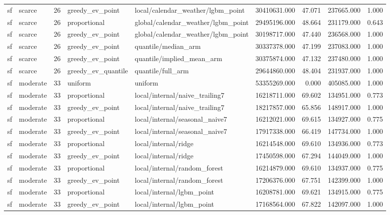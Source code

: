 \begin{tabular}{llrllrrrr}
sf & scarce & 26 & greedy\_ev\_point & local/calendar\_weather/lgbm\_point & 30410631.000 & 47.071 & 237665.000 & 1.000 \\
sf & scarce & 26 & proportional & global/calendar\_weather/lgbm\_point & 29495196.000 & 48.664 & 231179.000 & 0.643 \\
sf & scarce & 26 & greedy\_ev\_point & global/calendar\_weather/lgbm\_point & 30198717.000 & 47.440 & 236568.000 & 1.000 \\
sf & scarce & 26 & greedy\_ev\_point & quantile/median\_arm & 30337378.000 & 47.199 & 237083.000 & 1.000 \\
sf & scarce & 26 & greedy\_ev\_point & quantile/implied\_mean\_arm & 30375874.000 & 47.132 & 237480.000 & 1.000 \\
sf & scarce & 26 & greedy\_ev\_quantile & quantile/full\_arm & 29644860.000 & 48.404 & 231937.000 & 1.000 \\
sf & moderate & 33 & uniform & uniform & 53355269.000 & 0.000 & 405085.000 & 1.000 \\
sf & moderate & 33 & proportional & local/internal/naive\_trailing7 & 16218711.000 & 69.602 & 134951.000 & 0.773 \\
sf & moderate & 33 & greedy\_ev\_point & local/internal/naive\_trailing7 & 18217857.000 & 65.856 & 148917.000 & 1.000 \\
sf & moderate & 33 & proportional & local/internal/seasonal\_naive7 & 16212021.000 & 69.615 & 134927.000 & 0.775 \\
sf & moderate & 33 & greedy\_ev\_point & local/internal/seasonal\_naive7 & 17917338.000 & 66.419 & 147734.000 & 1.000 \\
sf & moderate & 33 & proportional & local/internal/ridge & 16214548.000 & 69.610 & 134936.000 & 0.773 \\
sf & moderate & 33 & greedy\_ev\_point & local/internal/ridge & 17450598.000 & 67.294 & 144049.000 & 1.000 \\
sf & moderate & 33 & proportional & local/internal/random\_forest & 16214879.000 & 69.610 & 134937.000 & 0.775 \\
sf & moderate & 33 & greedy\_ev\_point & local/internal/random\_forest & 17206376.000 & 67.751 & 142399.000 & 1.000 \\
sf & moderate & 33 & proportional & local/internal/lgbm\_point & 16208781.000 & 69.621 & 134915.000 & 0.775 \\
sf & moderate & 33 & greedy\_ev\_point & local/internal/lgbm\_point & 17168564.000 & 67.822 & 142097.000 & 1.000 \\

\end{tabular}
